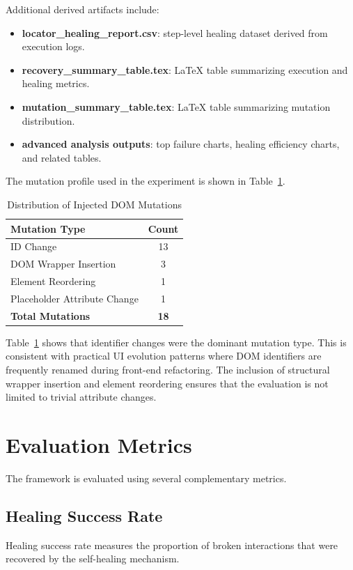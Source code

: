 \documentclass[conference]{IEEEtran}
\begin{document}
Additional derived artifacts include:
\begin{itemize}[leftmargin=1.2em]
    \item \textbf{locator\_healing\_report.csv}: step-level healing dataset derived from execution logs.
    \item \textbf{recovery\_summary\_table.tex}: LaTeX table summarizing execution and healing metrics.
    \item \textbf{mutation\_summary\_table.tex}: LaTeX table summarizing mutation distribution.
    \item \textbf{advanced analysis outputs}: top failure charts, healing efficiency charts, and related tables.
\end{itemize}

The mutation profile used in the experiment is shown in Table~\ref{tab:dom_mutations}.

\begin{table}[H]
\centering
\caption{Distribution of Injected DOM Mutations}
\label{tab:dom_mutations}
\begin{tabular}{lc}
\toprule
\textbf{Mutation Type} & \textbf{Count} \\
\midrule
ID Change & 13 \\
DOM Wrapper Insertion & 3 \\
Element Reordering & 1 \\
Placeholder Attribute Change & 1 \\
\midrule
\textbf{Total Mutations} & \textbf{18} \\
\bottomrule
\end{tabular}
\end{table}

Table~\ref{tab:dom_mutations} shows that identifier changes were the dominant mutation type. This is consistent with practical UI evolution patterns where DOM identifiers are frequently renamed during front-end refactoring. The inclusion of structural wrapper insertion and element reordering ensures that the evaluation is not limited to trivial attribute changes.

\section{Evaluation Metrics}
The framework is evaluated using several complementary metrics.

\subsection{Healing Success Rate}
Healing success rate measures the proportion of broken interactions that were recovered by the self-healing mechanism.
\end{document}
